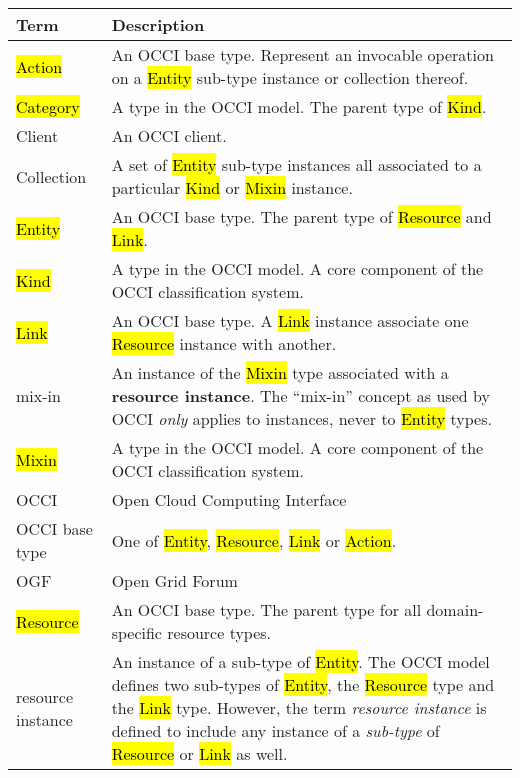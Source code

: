\begin{tabular}{l|p{12cm}}
Term & Description \\
\hline
\hl{Action} & An OCCI base type. Represent an invocable operation on a \hl{Entity} sub-type instance or collection thereof. \\

\hl{Category} & A type in the OCCI model. The parent type of \hl{Kind}. \\

Client & An OCCI client.\\

Collection & A set of \hl{Entity} sub-type instances all associated to a particular \hl{Kind} or \hl{Mixin} instance. \\

\hl{Entity} & An OCCI base type. The parent type of \hl{Resource} and \hl{Link}. \\

\hl{Kind} & A type in the OCCI model. A core component of the OCCI classification system. \\

\hl{Link} & An OCCI base type. A \hl{Link} instance associate one \hl{Resource} instance with another. \\

mix-in & An instance of the \hl{Mixin} type associated with a {\bf resource
 instance}. The ``mix-in'' concept as used by OCCI {\em only} applies to
 instances, never to \hl{Entity} types. \\

\hl{Mixin} & A type in the OCCI model. A core component of the OCCI classification system. \\

OCCI & Open Cloud Computing Interface \\

OCCI base type & One of \hl{Entity}, \hl{Resource}, \hl{Link} or \hl{Action}. \\

OGF & Open Grid Forum \\

\hl{Resource} & An OCCI base type. The parent type for all domain-specific resource types. \\

resource instance & An instance of a sub-type of \hl{Entity}. The OCCI
 model defines two sub-types of \hl{Entity}, the \hl{Resource} type and the
 \hl{Link} type. However, the term {\em resource instance} is defined to
 include any instance of a {\em sub-type} of \hl{Resource} or \hl{Link} as
 well. \\


\end{tabular}
